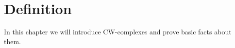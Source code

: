 \chapter{Definition}
In this chapter we will introduce CW-complexes and prove basic facts about them.

